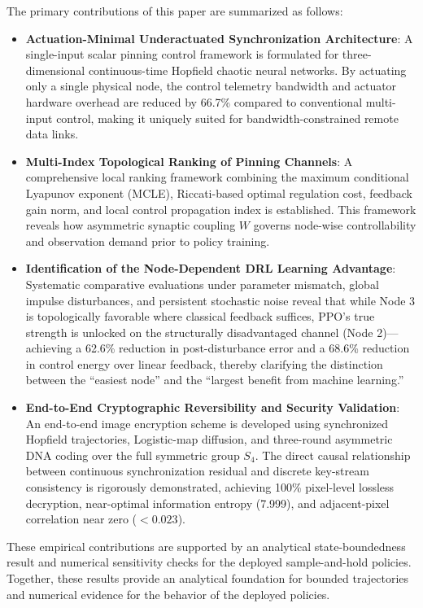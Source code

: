 \documentclass[a4paper,fleqn]{cas-sc}
\theoremstyle{plain}
\theoremstyle{definition}
\begin{document}
The primary contributions of this paper are summarized as follows:
\begin{itemize}
	\item \textbf{Actuation-Minimal Underactuated Synchronization Architecture}: A single-input scalar pinning control framework is formulated for three-dimensional continuous-time Hopfield chaotic neural networks. By actuating only a single physical node, the control telemetry bandwidth and actuator hardware overhead are reduced by 66.7\% compared to conventional multi-input control, making it uniquely suited for bandwidth-constrained remote data links.

	\item \textbf{Multi-Index Topological Ranking of Pinning Channels}: A comprehensive local ranking framework combining the maximum conditional Lyapunov exponent (MCLE), Riccati-based optimal regulation cost, feedback gain norm, and local control propagation index is established. This framework reveals how asymmetric synaptic coupling $W$ governs node-wise controllability and observation demand prior to policy training.

	\item \textbf{Identification of the Node-Dependent DRL Learning Advantage}: Systematic comparative evaluations under parameter mismatch, global impulse disturbances, and persistent stochastic noise reveal that while Node 3 is topologically favorable where classical feedback suffices, PPO's true strength is unlocked on the structurally disadvantaged channel (Node 2)—achieving a 62.6\% reduction in post-disturbance error and a 68.6\% reduction in control energy over linear feedback, thereby clarifying the distinction between the ``easiest node'' and the ``largest benefit from machine learning.''

	\item \textbf{End-to-End Cryptographic Reversibility and Security Validation}: An end-to-end image encryption scheme is developed using synchronized Hopfield trajectories, Logistic-map diffusion, and three-round asymmetric DNA coding over the full symmetric group $S_4$. The direct causal relationship between continuous synchronization residual and discrete key-stream consistency is rigorously demonstrated, achieving 100\% pixel-level lossless decryption, near-optimal information entropy (7.999), and adjacent-pixel correlation near zero ($<0.023$).
\end{itemize}

These empirical contributions are supported by an analytical state-boundedness result and numerical sensitivity checks for the deployed sample-and-hold policies. Together, these results provide an analytical foundation for bounded trajectories and numerical evidence for the behavior of the deployed policies.
\end{document}

